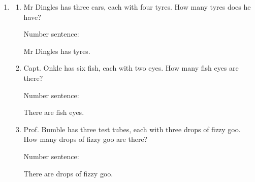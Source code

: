 \documentclass{tufte-book}
\begin{document}
\begin{enumerate}
\item
\begin{enumerate}
  \item Mr Dingles has three cars, each with four tyres. How many tyres does he have?\bigskip\par
  Number sentence: \dotfill\bigskip\par
  Mr Dingles has \dotfill\bigskip tyres.
  \item Capt. Onkle has six fish, each with two eyes. How many fish eyes are there?\bigskip\par
  Number sentence: \dotfill\bigskip\par
  There are \dotfill\bigskip fish eyes.
  \item Prof. Bumble has three test tubes, each with three drops of fizzy goo. How many drops of fizzy goo are there?\bigskip\par
  Number sentence: \dotfill\bigskip\par
  There are \dotfill\bigskip drops of fizzy goo.
\end{enumerate}

\end{enumerate}
\end{document}
